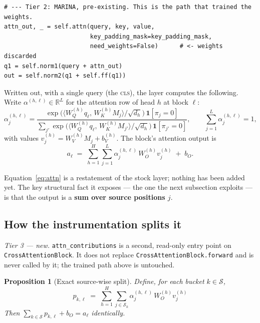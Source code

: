 \documentclass[11pt]{article}
\theoremstyle{plain}
\newtheorem{proposition}{Proposition}
\theoremstyle{remark}
\newcommand{\R}{\mathbb{R}}
\newcommand{\Sset}{\mathcal{S}}
\newcommand{\ip}[2]{\langle #1,\, #2\rangle}
\newcommand{\code}[1]{\texttt{\small #1}}
\begin{document}
\begin{lstlisting}
# --- Tier 2: MARINA, pre-existing. This is the path that trained the weights.
attn_out, _ = self.attn(query, key, value,
                        key_padding_mask=key_padding_mask,
                        need_weights=False)      # <- weights discarded
q1 = self.norm1(query + attn_out)
out = self.norm2(q1 + self.ff(q1))
\end{lstlisting}

\noindent
Written out, with a single query (the \textsc{cls}), the layer computes the
following. Write $\alpha^{(h,\ell)} \in \R^L$ for the attention row of head $h$
at block $\ell$:
\[
  \alpha^{(h,\ell)}_j
  = \frac{\exp\!\big(\ip{W_Q^{(h)} q_\ell}{W_K^{(h)} M_j} / \sqrt{d_h}\big)\,
          \mathbf{1}[\pi_j = 0]}
         {\sum_{j'} \exp\!\big(\ip{W_Q^{(h)} q_\ell}{W_K^{(h)} M_{j'}} / \sqrt{d_h}\big)\,
          \mathbf{1}[\pi_{j'} = 0]},
  \qquad
  \sum_{j=1}^{L} \alpha^{(h,\ell)}_j = 1,
\]
with values $v^{(h)}_j = W_V^{(h)} M_j + b_V^{(h)}$. The block's attention
output is
\begin{equation}
  a_\ell \;=\; \sum_{h=1}^{H} \sum_{j=1}^{L}
    \alpha^{(h,\ell)}_j\, W_O^{(h)} v^{(h)}_j \;+\; b_O .
  \label{eq:attn}
\end{equation}

\noindent
Equation~\eqref{eq:attn} is a restatement of the stock layer; nothing has been
added yet. The key structural fact it exposes --- the one the next subsection
exploits --- is that the output is a \textbf{sum over source positions $j$}.

\subsection{How the instrumentation splits it}

\emph{Tier 3 --- new.} \code{attn\_contributions} is a second, read-only entry
point on \code{CrossAttentionBlock}. It does not replace
\code{CrossAttentionBlock.forward} and is never called by it; the trained path
above is untouched.

\begin{proposition}[Exact source-wise split]
\label{prop:split}
Define, for each bucket $k \in \Sset$,
\begin{equation}
  \boxed{\;
  p_{k,\ell} \;=\; \sum_{h=1}^{H} \sum_{j \in \Sset_k}
    \alpha^{(h,\ell)}_j\, W_O^{(h)} v^{(h)}_j \; }
  \label{eq:parts}
\end{equation}
Then $\sum_{k \in \Sset} p_{k,\ell} + b_O = a_\ell$ identically.
\end{proposition}
\end{document}

